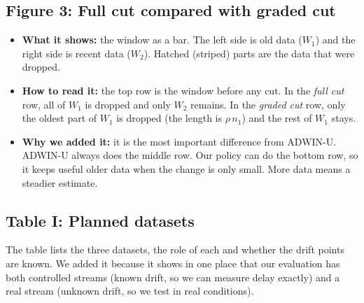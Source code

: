 \documentclass[11pt,a4paper]{article}
\begin{document}
\subsection{Figure 3: Full cut compared with graded cut}

\begin{center}
\end{center}

\begin{itemize}
  \item \textbf{What it shows:} the window as a bar. The left side is old data ($W_1$) and the right side is recent data ($W_2$). Hatched (striped) parts are the data that were dropped.
  \item \textbf{How to read it:} the top row is the window before any cut. In the \emph{full cut} row, all of $W_1$ is dropped and only $W_2$ remains. In the \emph{graded cut} row, only the oldest part of $W_1$ is dropped (the length is $\rho\, n_1$) and the rest of $W_1$ stays.
  \item \textbf{Why we added it:} it is the most important difference from ADWIN-U. ADWIN-U always does the middle row. Our policy can do the bottom row, so it keeps useful older data when the change is only small. More data means a steadier estimate.
\end{itemize}

\subsection{Table I: Planned datasets}
The table lists the three datasets, the role of each and whether the drift points are known. We added it because it shows in one place that our evaluation has both controlled streams (known drift, so we can measure delay exactly) and a real stream (unknown drift, so we test in real conditions).
\end{document}
